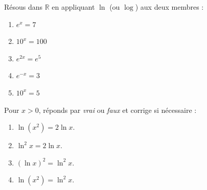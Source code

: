 \documentclass[11pt,a4paper]{article}
\newcommand{\R}{\mathbb{R}}
\begin{document}
\begin{exo}
Résous dans $\R$ en appliquant $\ln$ (ou $\log$) aux deux membres :
\begin{enumerate}[label=\alph*),leftmargin=2em,topsep=1pt,itemsep=1pt]
  \item $e^{x}=7$ \qquad
  \item $10^{x}=100$ \qquad
  \item $e^{2x}=e^{5}$ \qquad
  \item $e^{-x}=3$ \qquad
  \item $10^{x}=5$
\end{enumerate}
\end{exo}

\begin{exo}
Pour $x>0$, réponds par \emph{vrai} ou \emph{faux} et corrige si nécessaire :
\begin{enumerate}[label=\alph*),leftmargin=2em,topsep=1pt,itemsep=1pt]
  \item $\ln(x^{2})=2\ln x$. \qquad
  \item $\ln^{2}x=2\ln x$. \qquad
  \item $(\ln x)^{2}=\ln^{2}x$. \qquad
  \item $\ln(x^{2})=\ln^{2}x$.
\end{enumerate}
\end{exo}
\end{document}
